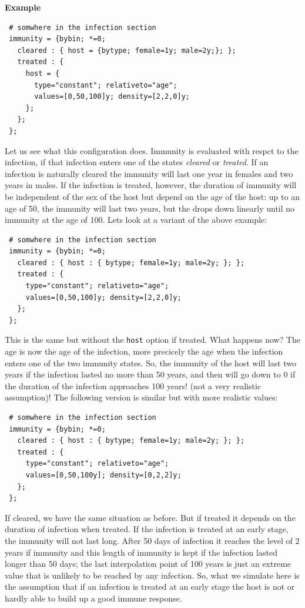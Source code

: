 \documentclass[11pt]{article}
\newenvironment{example}{\par\smallskip\noindent\begingroup\small\textbf{\small Example\enskip}}{\endgroup\par\smallskip}
\begin{document}
\begin{example}
\begin{verbatim}
 # somwhere in the infection section
 immunity = {bybin; *=0;
   cleared : { host = {bytype; female=1y; male=2y;}; }; 
   treated : { 
     host = {
       type="constant"; relativeto="age"; 
       values=[0,50,100]y; density=[2,2,0]y; 
     }; 
   }; 
 };
\end{verbatim}
Let us see what this configuration does. Immunity is evaluated with respct to
the infection, if that infection enters one of the states \emph{cleared} or
\emph{treated}. If an infection is naturally cleared the immunity will last one
year in females and two years in males. If the infection is treated, however,
the duration of immunity will be independent of the sex of the host but depend
on the age of the host: up to an age of 50, the immunity will last two years,
but the drops down linearly until no immunity at the age of 100. Lets look at a
variant of the above example:
\begin{verbatim}
 # somwhere in the infection section
 immunity = {bybin; *=0;
   cleared : { host : { bytype; female=1y; male=2y; }; }; 
   treated : { 
     type="constant"; relativeto="age"; 
     values=[0,50,100]y; density=[2,2,0]y; 
   }; 
 };
\end{verbatim}
This is the same but without the \texttt{host} option if treated. What happens
now? The age is now the age of the infection, more precicely the age when the
infection enters one of the two immunity states. So, the immunity of the
host will last two years if the infection lasted no more than 50 years, and
then will go down to 0 if the duration of the infection approaches 100 years!
(not a very realistic assumption)! The following version is similar but with
more realistic values:
\begin{verbatim}
 # somwhere in the infection section
 immunity = {bybin; *=0;
   cleared : { host : { bytype; female=1y; male=2y; }; }; 
   treated : { 
     type="constant"; relativeto="age"; 
     values=[0,50,100y]; density=[0,2,2]y; 
   }; 
 };
\end{verbatim}
If cleared, we have the same situation as before. But if treated it depends on
the duration of infection when treated. If the infection is treated at an early
stage, the immunity will not last long. After 50 days of infection it reaches
the level of 2 years if immunity and this length of immunity is kept if the
infection lasted longer than 50 days; the last interpolation point of 100
years is just an extreme value that is unlikely to be reached by any infection.
So, what we simulate here is the assumption that if an infection is treated at
an early stage the host is not or hardly able to build up a good immune
response. 
\end{example}
\end{document}
